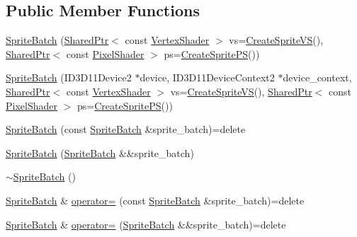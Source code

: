 \subsection*{Public Member Functions}
\begin{DoxyCompactItemize}
\item 
\hyperlink{classmage_1_1_sprite_batch_ac5247e922d22bee4006166a3462c61c9}{Sprite\+Batch} (\hyperlink{namespacemage_a1e01ae66713838a7a67d30e44c67703e}{Shared\+Ptr}$<$ const \hyperlink{classmage_1_1_vertex_shader}{Vertex\+Shader} $>$ vs=\hyperlink{namespacemage_ab9ab12e1c1b17f5d218eb7396e6fda40}{Create\+Sprite\+VS}(), \hyperlink{namespacemage_a1e01ae66713838a7a67d30e44c67703e}{Shared\+Ptr}$<$ const \hyperlink{namespacemage_ac98506b7edd999ea43ec46fbd0330238}{Pixel\+Shader} $>$ ps=\hyperlink{namespacemage_acf33218f09d9c43ecdb0d029ddf6f7d7}{Create\+Sprite\+PS}())
\item 
\hyperlink{classmage_1_1_sprite_batch_ad8670e85429b05e3c58b2139cf455e13}{Sprite\+Batch} (I\+D3\+D11\+Device2 $\ast$device, I\+D3\+D11\+Device\+Context2 $\ast$device\+\_\+context, \hyperlink{namespacemage_a1e01ae66713838a7a67d30e44c67703e}{Shared\+Ptr}$<$ const \hyperlink{classmage_1_1_vertex_shader}{Vertex\+Shader} $>$ vs=\hyperlink{namespacemage_ab9ab12e1c1b17f5d218eb7396e6fda40}{Create\+Sprite\+VS}(), \hyperlink{namespacemage_a1e01ae66713838a7a67d30e44c67703e}{Shared\+Ptr}$<$ const \hyperlink{namespacemage_ac98506b7edd999ea43ec46fbd0330238}{Pixel\+Shader} $>$ ps=\hyperlink{namespacemage_acf33218f09d9c43ecdb0d029ddf6f7d7}{Create\+Sprite\+PS}())
\item 
\hyperlink{classmage_1_1_sprite_batch_a10fe1d6cf1d2de9e087b370e7d696be8}{Sprite\+Batch} (const \hyperlink{classmage_1_1_sprite_batch}{Sprite\+Batch} \&sprite\+\_\+batch)=delete
\item 
\hyperlink{classmage_1_1_sprite_batch_a16f89aba054d8a08e5257c46813f4713}{Sprite\+Batch} (\hyperlink{classmage_1_1_sprite_batch}{Sprite\+Batch} \&\&sprite\+\_\+batch)
\item 
\hyperlink{classmage_1_1_sprite_batch_a1c284e2c0ed96081f9f2fb1f84e5817f}{$\sim$\+Sprite\+Batch} ()
\item 
\hyperlink{classmage_1_1_sprite_batch}{Sprite\+Batch} \& \hyperlink{classmage_1_1_sprite_batch_aa2a5df588d7589a36b38b35dc8a08a48}{operator=} (const \hyperlink{classmage_1_1_sprite_batch}{Sprite\+Batch} \&sprite\+\_\+batch)=delete
\item 
\hyperlink{classmage_1_1_sprite_batch}{Sprite\+Batch} \& \hyperlink{classmage_1_1_sprite_batch_ad46c172200bf47c10fa13fb3a70a4104}{operator=} (\hyperlink{classmage_1_1_sprite_batch}{Sprite\+Batch} \&\&sprite\+\_\+batch)=delete

\end{DoxyCompactItemize}
